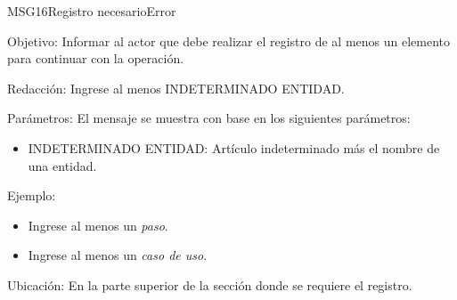 \begin{mensaje}{MSG16}{Registro necesario}{Error}
	\item [Objetivo:] Informar al actor que debe realizar el registro de al menos un elemento para continuar con la operación.
	\item[Redacción:] Ingrese al menos INDETERMINADO ENTIDAD.
	\item[Parámetros:] El mensaje se muestra con base en los siguientes parámetros:
	\begin{itemize}
		\item INDETERMINADO ENTIDAD: Artículo indeterminado más el nombre de una entidad.
	\end{itemize}
	\item[Ejemplo:] \begin{itemize}
		\item Ingrese al menos un {\em paso}.
		\item Ingrese al menos un {\em caso de uso}.
	\end{itemize}
	\item [Ubicación:] En la parte superior de la sección donde se requiere el registro.
\end{mensaje}